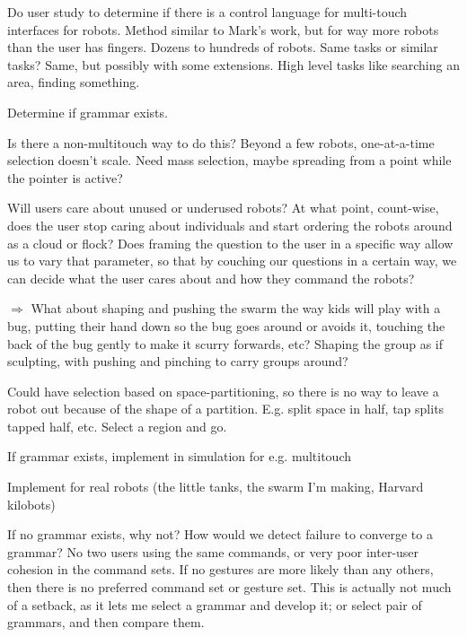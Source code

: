 \documentclass[]{article}
\begin{document}
Do user study to determine if there is a control language for multi-touch interfaces for robots.
Method similar to Mark's work, but for way more robots than the user has fingers. 
Dozens to hundreds of robots. 
Same tasks or similar tasks? Same, but possibly with some extensions. 
High level tasks like searching an area, finding something. 

Determine if grammar exists. 

Is there a non-multitouch way to do this? Beyond a few robots, one-at-a-time selection doesn't scale. Need mass selection, maybe spreading from a point while the pointer is active?

Will users care about unused or underused robots? At what point, count-wise, does the user stop caring about individuals and start ordering the robots around as a cloud or flock? Does framing the question to the user in a specific way allow us to vary that parameter, so that by couching our questions in a certain way, we can decide what the user cares about and how they command the robots?

$\Rightarrow$ What about shaping and pushing the swarm the way kids will play with a bug, putting their hand down so the bug goes around or avoids it, touching the back of the bug gently to make it scurry forwards, etc? Shaping the group as if sculpting, with pushing and pinching to carry groups around?

Could have selection based on space-partitioning, so there is no way to leave a robot out because of the shape of a partition. E.g. split space in half, tap splits tapped half, etc. Select a region and go. 

If grammar exists, implement in simulation for e.g. multitouch

Implement for real robots (the little tanks, the swarm I'm making, Harvard kilobots)

If no grammar exists, why not?
How would we detect failure to converge to a grammar? No two users using the same commands, or very poor inter-user cohesion in the command sets. If no gestures are more likely than any others, then there is no preferred command set or gesture set. 
This is actually not much of a setback, as it lets me select a grammar and develop it; or select pair of grammars, and then compare them.
\end{document}
